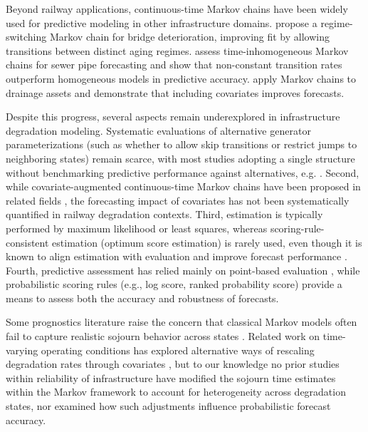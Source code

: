 Beyond railway applications, continuous-time Markov chains have been widely used for predictive modeling in other infrastructure domains. \citet{Mizutani2023RegimeSwitching} propose a regime-switching Markov chain for bridge deterioration, improving fit by allowing transitions between distinct aging regimes. \citet{JimenezRoa2024Nonhomogeneous} assess time-inhomogeneous Markov chains for sewer pipe forecasting and show that non-constant transition rates outperform homogeneous models in predictive accuracy. \citet{Wu2021ConditionPrediction} apply Markov chains to drainage assets and demonstrate that including covariates improves forecasts. %

Despite this progress, several aspects remain underexplored in infrastructure degradation modeling.
Systematic evaluations of alternative generator parameterizations (such as whether to allow skip transitions or restrict jumps to neighboring states) remain scarce, with most studies adopting a single structure without benchmarking predictive performance against alternatives, e.g. \citep{bisgaard2024A,Zbiciak2025}.
Second, while covariate-augmented continuous-time Markov chains have been proposed in related fields \citep{Wu2021ConditionPrediction}, the forecasting impact of covariates has not been systematically quantified in railway degradation contexts.
Third, estimation is typically performed by maximum likelihood or least squares, whereas scoring-rule-consistent estimation (optimum score estimation) is rarely used, even though it is known to align estimation with evaluation and improve forecast performance \citep{Gneiting2007,friedman1983a,Copas1983}.
Fourth, predictive assessment has relied mainly on point-based evaluation \citep{JimenezRoa2024Nonhomogeneous,Mizutani2023RegimeSwitching}, while probabilistic scoring rules (e.g., log score, ranked probability score) provide a means to assess both the accuracy and robustness of forecasts.

Some prognostics literature raise the concern that classical Markov models often fail to capture realistic sojourn behavior across states \citep{AIZPURUA2022}. Related work on time-varying operating conditions has explored alternative ways of rescaling degradation rates through covariates \citep{liu2024a,bisgaard2024A}, but to our knowledge no prior studies within reliability of infrastructure have modified the sojourn time estimates within the Markov framework to account for heterogeneity across degradation states, nor examined how such adjustments influence probabilistic forecast accuracy.



